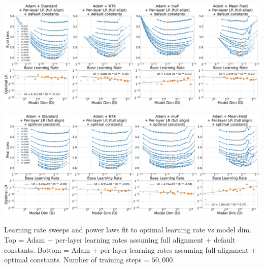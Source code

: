 \thispagestyle{plain}
\begin{SidewaysFigure}
\includegraphics[width=\linewidth]{icml2024/figures/lr_sweeps/appendix/adam/adam+50k_steps_per_module_lr.pdf}

\figvspace

\includegraphics[width=\linewidth]{icml2024/figures/lr_sweeps/appendix/adam/adam+50k_steps_per_module_lr_optimal_constants.pdf}
\caption{Learning rate sweeps and power laws fit to optimal learning rate vs model dim. Top = Adam + per-layer learning rates assuming full alignment + default constants. Bottom = Adam + per-layer learning rates assuming full alignment + optimal constants. Number of training steps = $50{,}000$.}
\end{SidewaysFigure}
\clearpage

